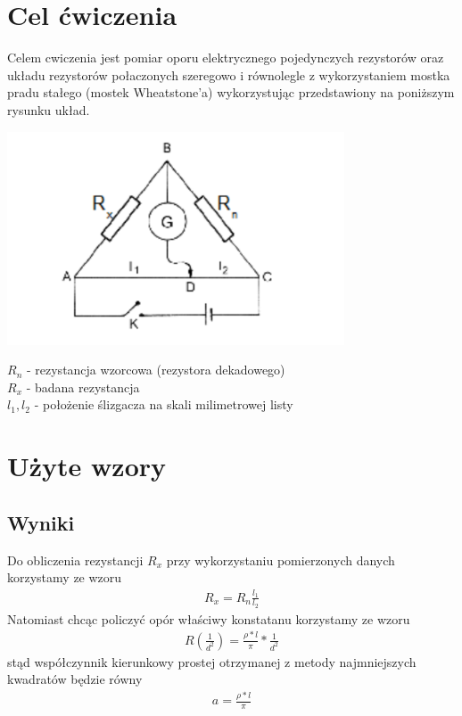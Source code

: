 \documentclass{article}
\begin{document}
\section{Cel ćwiczenia}
Celem cwiczenia jest pomiar oporu elektrycznego pojedynczych rezystorów
oraz układu rezystorów połaczonych szeregowo i równolegle z wykorzystaniem
mostka pradu stałego (mostek Wheatstone’a) wykorzystując przedstawiony na 
poniższym rysunku układ.

\begin{center}
\includegraphics[width=10cm]{e3}
\end{center}
$R_n$ - rezystancja wzorcowa (rezystora dekadowego) \\
$R_x$ - badana rezystancja \\
$l_1, l_2$ - położenie ślizgacza na skali milimetrowej listy

\section{Użyte wzory}

\subsection{Wyniki}
Do obliczenia rezystancji $R_x$ przy wykorzystaniu pomierzonych danych korzystamy ze wzoru
\begin{gather*}
	R_x = R_n\frac{l_1}{l_2}
\end{gather*} 
Natomiast chcąc policzyć opór właściwy konstatanu korzystamy ze wzoru 
\begin{gather*}
	R(\frac{1}{d^2}) = \frac{\rho * l}{\pi} * \frac{1}{d^2}
\end{gather*}
stąd współczynnik kierunkowy prostej otrzymanej z metody najmniejszych kwadratów będzie równy
\begin{gather*}
	a = \frac{\rho * l}{\pi} 
\end{gather*}
\end{document}
